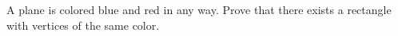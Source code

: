 A plane is colored blue and red in any way. Prove that there exists a rectangle with vertices of the same color.
